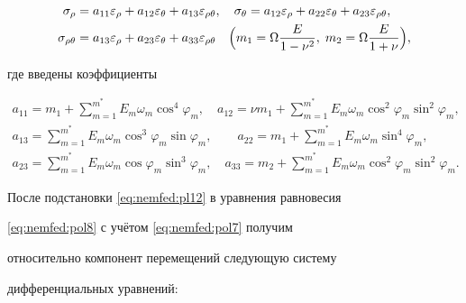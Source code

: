 \begin{equation}

\label{eq:nemfed:pl12}

\begin{aligned}

\sigma_\rho &

=a_{11}\varepsilon_\rho+a_{12}\varepsilon_\theta+a_{13}

\varepsilon_{\rho\theta}, \quad

\sigma_\theta=a_{12}\varepsilon_\rho+a_{22}\varepsilon_\theta+a_{23}

\varepsilon_{\rho\theta},\\

\sigma_{\rho\theta}

&=a_{13}\varepsilon_\rho+a_{23}\varepsilon_\theta+a_{33}

\varepsilon_{\rho\theta} \quad

\Bigl(m_1=\Omega\dfrac{E}{1-\nu^2},\;m_2=\Omega\dfrac{E}{1+\nu}\Bigr),

\end{aligned}

\end{equation}

где введены коэффициенты

\begin{gather*}

a_{11}=m_1+\sum_{m=1}^{m^*}E_m\omega_m\cos^4\varphi_m,\quad a_{12}=\nu m_1+\sum_{m=1}^{m^*}E_m\omega_m\cos^2\varphi_m\sin^2\varphi_m,\\

a_{13}=\sum_{m=1}^{m^*}E_m\omega_m\cos^3\varphi_m\sin\varphi_m,

\qquad

a_{22}=m_1+\sum_{m=1}^{m^*}E_m\omega_m\sin^4\varphi_m,\\

a_{23}=\sum_{m=1}^{m^*}E_m\omega_m\cos\varphi_m\sin^3\varphi_m,\quad

a_{33}=m_2+\sum_{m=1}^{m^*}E_m\omega_m\cos^2\varphi_m\sin^2\varphi_m.

\end{gather*}

После подстановки \eqref{eq:nemfed:pl12} в уравнения равновесия

\eqref{eq:nemfed:pol8} с учётом \eqref{eq:nemfed:pol7} получим

относительно компонент перемещений следующую систему

дифференциальных уравнений:

